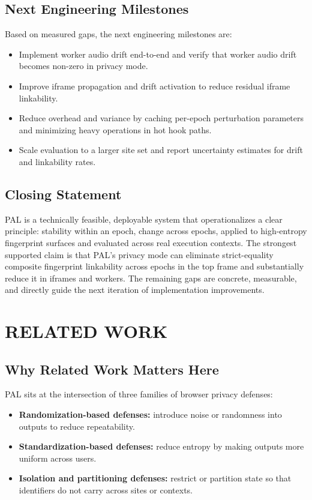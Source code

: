 \documentclass[11pt]{report}
\begin{document}
\section{Next Engineering Milestones}

Based on measured gaps, the next engineering milestones are:

\begin{itemize}
    \item Implement worker audio drift end-to-end and verify that worker audio drift becomes non-zero in privacy mode.
    \item Improve iframe propagation and drift activation to reduce residual iframe linkability.
    \item Reduce overhead and variance by caching per-epoch perturbation parameters and minimizing heavy operations in hot hook paths.
    \item Scale evaluation to a larger site set and report uncertainty estimates for drift and linkability rates.
\end{itemize}

\section{Closing Statement}

PAL is a technically feasible, deployable system that operationalizes a clear principle: stability within an epoch, change across epochs, applied to high-entropy fingerprint surfaces and evaluated across real execution contexts. The strongest supported claim is that PAL’s privacy mode can eliminate strict-equality composite fingerprint linkability across epochs in the top frame and substantially reduce it in iframes and workers. The remaining gaps are concrete, measurable, and directly guide the next iteration of implementation improvements.

\clearpage

\chapter{RELATED WORK}

\section{Why Related Work Matters Here}

PAL sits at the intersection of three families of browser privacy defenses:

\begin{itemize}
    \item \textbf{Randomization-based defenses:} introduce noise or randomness into outputs to reduce repeatability.
    \item \textbf{Standardization-based defenses:} reduce entropy by making outputs more uniform across users.
    \item \textbf{Isolation and partitioning defenses:} restrict or partition state so that identifiers do not carry across sites or contexts.
\end{itemize}
\end{document}
